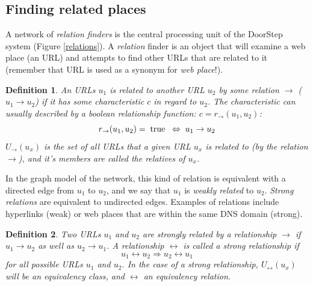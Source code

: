 \documentclass[a4paper,twoside]{danarticle}
\newtheorem{definition}{Definition}
\theoremstyle{remark}
\begin{document}
     \subsection{Finding related places} 
       A network of \textit{relation finders} is the central processing unit of 
       the DoorStep system (Figure \ref{relations}). 
       A \textit{relation} finder is an object that will 
       examine a web place (an URL) and attempts to find other URLs that are 
       related to it (remember that URL is used as a synonym for \textit{web
       place}!). 
       \begin{definition}
       An URLs $ u_1 $ is related to another URL $ u_2 $ by some relation 
       $ \rightarrow $
       ($ u_1 \rightarrow u_2 $) if it has some characteristic $ c $ in regard
       to $ u_2 $. The characteristic can usually described by a boolean
       relationship function: $ c = r_{\rightarrow}(u_1, u_2) $:
       \[
         r_{\rightarrow}(u_1, u_2) = \hspace{1mm} \mbox{true} \hspace{2mm} 
	     \Leftrightarrow \hspace{1mm} u_1 \rightarrow u_2
       \]
       $ U_{\rightarrow}(u_x) $ is the set of all URLs that a given URL $ u_x $ 
       is related to (by the relation $ \rightarrow $), and it's members are 
       called the \emph{relatives} of $ u_x $.
       \end{definition}
       In the graph model of the network, this kind of relation is equivalent
       with a directed edge from $ u_1 $ to $ u_2 $, and we say that $ u_1 $ is
       \textit{weakly related} to $ u_2 $. \textit{Strong relations} are
       equivalent to undirected edges.
       Examples of relations include hyperlinks (weak) or web places that are
       within the same DNS domain (strong). 
       \begin{definition}
       Two URLs $ u_1 $ and $ u_2 $ are \emph{strongly related} by a relationship
       $ \rightarrow $ if $ u_1 \rightarrow u_2 $ as well as 
       $ u_2 \rightarrow u_1 $. A relationship $ \leftrightarrow $ is called a
       \emph{strong} relationship if
       \[
         u_1 \leftrightarrow u_2 \Rightarrow u_2 \leftrightarrow u_1 
       \]
       for all possible URLs $ u_1 $ and $ u_2 $. In the case of a strong 
       relationship, $ U_{\leftrightarrow}(u_x) $ will be an equivalency 
       class, and $ \leftrightarrow $ an equivalency relation.
       \end{definition}
\end{document}
